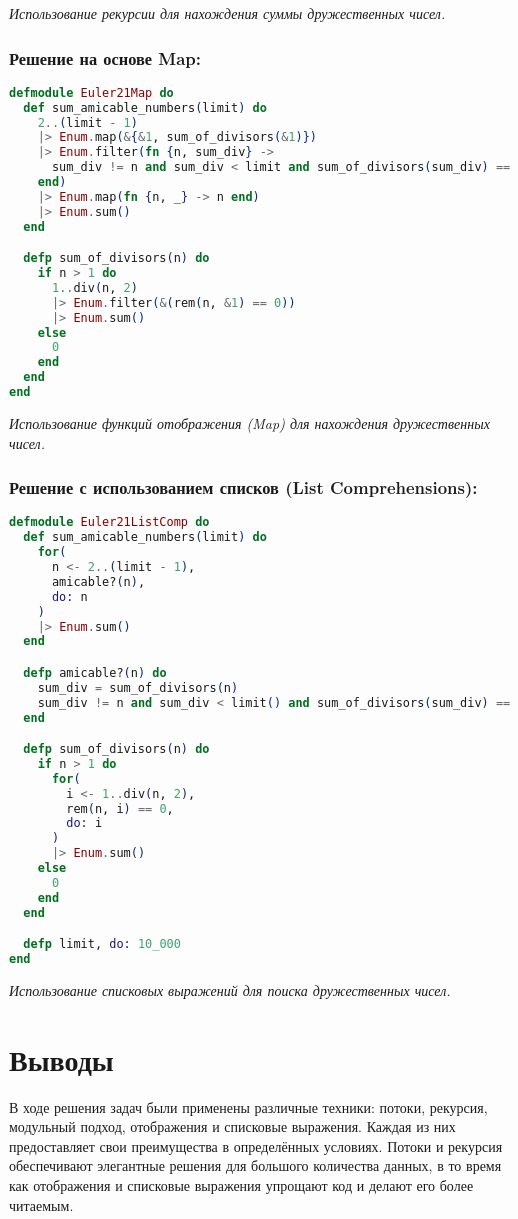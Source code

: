 \documentclass[a4paper]{article}
\begin{document}
\textit{Использование рекурсии для нахождения суммы дружественных чисел.}

\subsubsection*{Решение на основе Map:}

\begin{lstlisting}[language=elixir, caption={Использование Map для нахождения дружественных чисел},captionpos=b]
defmodule Euler21Map do
  def sum_amicable_numbers(limit) do
    2..(limit - 1)
    |> Enum.map(&{&1, sum_of_divisors(&1)})
    |> Enum.filter(fn {n, sum_div} ->
      sum_div != n and sum_div < limit and sum_of_divisors(sum_div) == n
    end)
    |> Enum.map(fn {n, _} -> n end)
    |> Enum.sum()
  end

  defp sum_of_divisors(n) do
    if n > 1 do
      1..div(n, 2)
      |> Enum.filter(&(rem(n, &1) == 0))
      |> Enum.sum()
    else
      0
    end
  end
end
\end{lstlisting}

\textit{Использование функций отображения (Map) для нахождения дружественных чисел.}

\subsubsection*{Решение с использованием списков (List Comprehensions):}

\begin{lstlisting}[language=elixir, caption={Использование списковых выражений для нахождения дружественных чисел},captionpos=b]
defmodule Euler21ListComp do
  def sum_amicable_numbers(limit) do
    for(
      n <- 2..(limit - 1),
      amicable?(n),
      do: n
    )
    |> Enum.sum()
  end

  defp amicable?(n) do
    sum_div = sum_of_divisors(n)
    sum_div != n and sum_div < limit() and sum_of_divisors(sum_div) == n
  end

  defp sum_of_divisors(n) do
    if n > 1 do
      for(
        i <- 1..div(n, 2),
        rem(n, i) == 0,
        do: i
      )
      |> Enum.sum()
    else
      0
    end
  end

  defp limit, do: 10_000
end
\end{lstlisting}

\textit{Использование списковых выражений для поиска дружественных чисел.}

\section*{Выводы}

В ходе решения задач были применены различные техники: потоки, рекурсия, модульный подход, отображения и списковые выражения. Каждая из них предоставляет свои преимущества в определённых условиях. Потоки и рекурсия обеспечивают элегантные решения для большого количества данных, в то время как отображения и списковые выражения упрощают код и делают его более читаемым.
\end{document}
